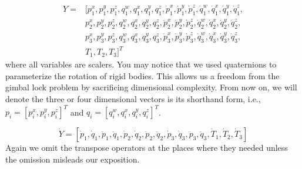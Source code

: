 \documentclass[a4paper,10pt]{article}
\begin{document}
\begin{align*}
Y = {} & [p_1^x, p_1^y, p_1^z, q_1^w, q_1^x, q_1^y, q_1^z, \dot{p}_1^x, \dot{p}_1^y, \dot{p}_1^z, \dot{q}_1^w, \dot{q}_1^x, \dot{q}_1^y, \dot{q}_1^z,\\
       &  p_2^x, p_2^y, p_2^z, q_2^w, q_2^x, q_2^y, q_2^z, \dot{p}_2^x, \dot{p}_2^y, \dot{p}_2^z, \dot{q}_2^w, \dot{q}_2^x, \dot{q}_2^y, \dot{q}_2^z,\\
       &  p_3^x, p_3^y, p_3^z, q_3^w, q_3^x, q_3^y, q_3^z, \dot{p}_3^x, \dot{p}_3^y, \dot{p}_3^z, \dot{q}_3^w, \dot{q}_3^x, \dot{q}_3^y, \dot{q}_3^z,\\
       & T_1, T_2, T_3]^T
\end{align*}
where all variables are scalers. You may notice that we used quaternions
to parameterize the rotation of rigid bodies. This allows us a freedom
from the gimbal lock problem by sacrificing dimensional complexity. From
now on, we will denote the three or four dimensional vectors is its shorthand
form, i.e., $p_i=[p_i^x, p_i^y, p_i^z]^T$ and $q_i=[q_i^w, q_i^x, q_i^y, q_i^z]^T$.

\begin{equation}
\dot{Y}  =  [\dot{p}_1, \dot{q}_1, \ddot{p}_1, \ddot{q}_1,
               \dot{p}_2, \dot{q}_2, \ddot{p}_2, \ddot{q}_2,
               \dot{p}_3, \dot{q}_3, \ddot{p}_3, \ddot{q}_3,
               \dot{T}_1, \dot{T}_2, \dot{T}_3]
\end{equation}
Again we omit the transpose operators at the places where they needed
unless the omission misleads our exposition.
\end{document}
